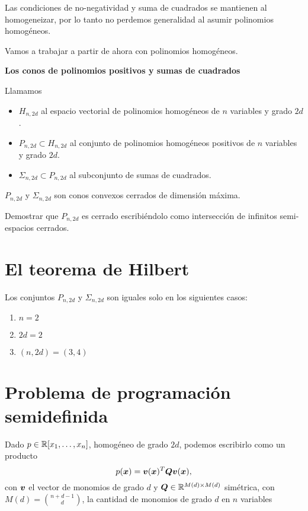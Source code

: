 \begin{prop} Las condiciones de no-negatividad y suma de cuadrados se mantienen al homogeneizar, por lo tanto no perdemos generalidad al asumir polinomios homogéneos.
\end{prop}

Vamos a trabajar a partir de ahora con polinomios homogéneos.

\textbf{Los conos de polinomios positivos y sumas de cuadrados}

Llamamos
\begin{itemize}
\item $H_{n,2d}$ al espacio vectorial de polinomios homog\'eneos de $n$ variables y grado $2d$.
\item $P_{n,2d} \subset H_{n,2d}$ al conjunto de polinomios homog\'eneos positivos de $n$ variables y grado $2d$.
\item $\Sigma_{n,2d} \subset P_{n,2d}$ al subconjunto de sumas de cuadrados.
\end{itemize}

\begin{prop}
$P_{n,2d}$ y $\Sigma_{n,2d}$ son conos convexos cerrados de dimensión máxima.
\end{prop}

\begin{ejercicio}
Demostrar que $P_{n,2d}$ es cerrado escribiéndolo como intersección de infinitos semi-espacios cerrados.
\end{ejercicio}

\section{El teorema de Hilbert}

\begin{theorem}
Los conjuntos $P_{n,2d}$ y $\Sigma_{n,2d}$ son iguales solo en los siguientes casos:

\begin{enumerate}
 \item $n = 2$
 \item $2d=2$
 \item $(n,2d) = (3,4)$
\end{enumerate}
\end{theorem}

\section{Problema de programaci\'on semidefinida}
Dado $p \in \mathbb{R}[x_1, \dots, x_n]$, homog\'eneo de grado $2d$, podemos escribirlo como un producto
\[
p(\bm{x}) = \bm{v}(\bm{x})^T \bm{Q} \bm{v}(\bm{x}),
\]
con $\bm{v}$ el vector de monomios de grado $d$ y $\bm{Q} \in \mathbb{R}^{M(d) \times M(d)}$ sim\'etrica, con $M(d) =  \binom{n+d-1}{d}$, la cantidad de monomios de grado $d$ en $n$ variables

